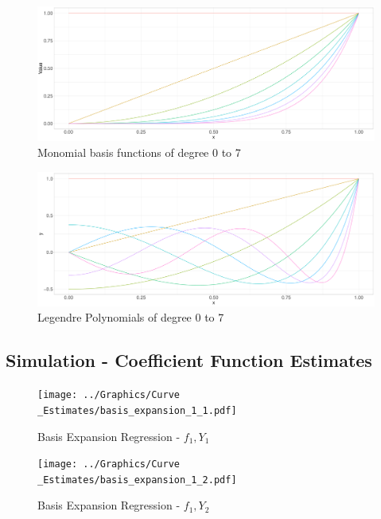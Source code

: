 \documentclass[11pt,twoside,a4paper]{article}
\begin{document}
	\begin{figure}[H]\label{monomial_basis}
		\includegraphics[width = \textwidth]{../Graphics/Monomial_Basis.pdf}
		\caption{Monomial basis functions of degree 0 to 7}
	\end{figure}

	\begin{figure}[H]\label{Legendre_basis}
		\includegraphics[width = \textwidth]{../Graphics/Legendre_Plot.pdf}
		\caption{Legendre Polynomials of degree 0 to 7}
	\end{figure}

	
	
	\newpage
	\subsection{Simulation - Coefficient Function Estimates}\label{Estimates_sim}
	
	\begin{figure}[H]
		\centering
		\begin{minipage}{.5\textwidth}
			\centering
			\texttt{[image: ../Graphics/Curve\\\_Estimates/basis\_expansion\_1\_1.pdf]}
			\caption{Basis Expansion Regression - $f_1, Y_1$}
			\label{basis_expansion_1_1}
		\end{minipage}%
		\begin{minipage}{.5\textwidth}
			\centering
			\texttt{[image: ../Graphics/Curve\\\_Estimates/basis\_expansion\_1\_2.pdf]}
			\caption{Basis Expansion Regression - $f_1, Y_2$}
			\label{basis_expansion_1_2}
		\end{minipage}
	\end{figure}
	
\end{document}
